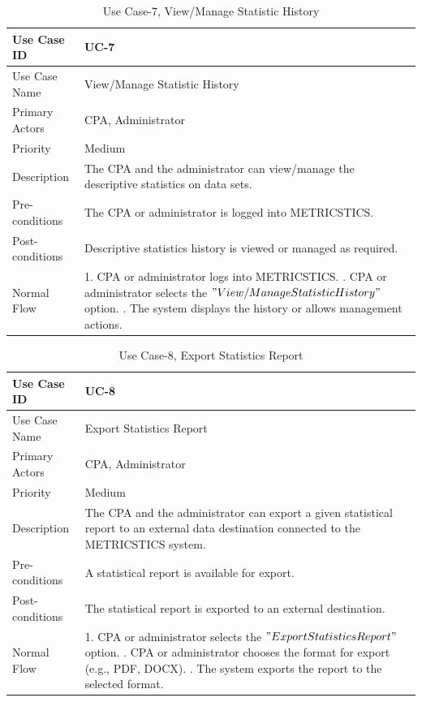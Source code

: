 \begin{table}[H]
\centering
\def\arraystretch{1.5}
\begin{tabular}{|l|p{4.5in}|}
\hline
Use Case ID & UC-7\\ \hline
Use Case Name & View/Manage Statistic History\\ \hline
Primary Actors & CPA, Administrator\\ \hline
Priority & Medium\\ \hline
Description & The CPA and the administrator can view/manage the descriptive statistics on data sets.\\ \hline
Pre-conditions & The CPA or administrator is logged into METRICSTICS.\\ \hline
Post-conditions & Descriptive statistics history is viewed or managed as required.\\ \hline
Normal Flow & 1. CPA or administrator logs into METRICSTICS.
     \newline 2. CPA or administrator selects the $"View/Manage Statistic History"$ \mbox{option}.
     \newline 3. The system displays the history or allows management actions.
    \\ \hline
\end{tabular}
\caption{Use Case-7, View/Manage Statistic History}
\end{table}


\begin{table}[H]
\centering
\def\arraystretch{1.5}
\begin{tabular}{|l|p{4.5in}|}
\hline
Use Case ID & UC-8\\ \hline
Use Case Name & Export Statistics Report\\ \hline
Primary Actors & CPA, Administrator\\ \hline
Priority & Medium\\ \hline
Description & The CPA and the administrator can export a given statistical report to an external data destination connected to the METRICSTICS system.\\ \hline
Pre-conditions & A statistical report is available for export.\\ \hline
Post-conditions & The statistical report is exported to an external destination.\\ \hline
Normal Flow & 1. CPA or administrator selects the $"Export Statistics Report"$ option.
     \newline 2. CPA or administrator chooses the format for export (e.g., PDF, DOCX).
     \newline 3. The system exports the report to the selected format.
    \\ \hline
\end{tabular}
\caption{Use Case-8, Export Statistics Report}
\end{table}


